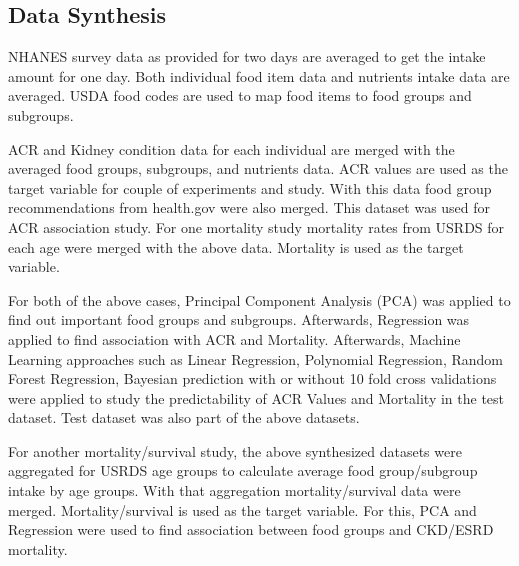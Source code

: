 \subsection{Data Synthesis}
\noindent NHANES survey data as provided for two days are averaged to get the intake amount for one day. Both individual food item data and nutrients intake data are averaged. USDA food codes are used to map food items to food groups and subgroups.

\noindent ACR and Kidney condition data for each individual are merged with the averaged food groups, subgroups, and nutrients data. ACR values are used as the target variable for couple of experiments and study. With this data food group recommendations from health.gov were also merged. This dataset was used for ACR association study. For one mortality study mortality rates from USRDS for each age were merged with the above data. Mortality is used as the target variable.

\noindent For both of the above cases, Principal Component Analysis (PCA) was applied to find out important food groups and subgroups. Afterwards, Regression was applied to find association with ACR and Mortality. Afterwards, Machine Learning approaches such as Linear Regression, Polynomial Regression, Random Forest Regression, Bayesian prediction with or without 10 fold cross validations were applied to study the predictability of ACR Values and Mortality in the test dataset. Test dataset was also part of the above datasets.

\noindent For another mortality/survival study, the above synthesized datasets were aggregated for USRDS age groups to calculate average food group/subgroup intake by age groups. With that aggregation mortality/survival data were merged. Mortality/survival is used as the target variable. For this, PCA and Regression were used to find association between food groups and CKD/ESRD mortality.